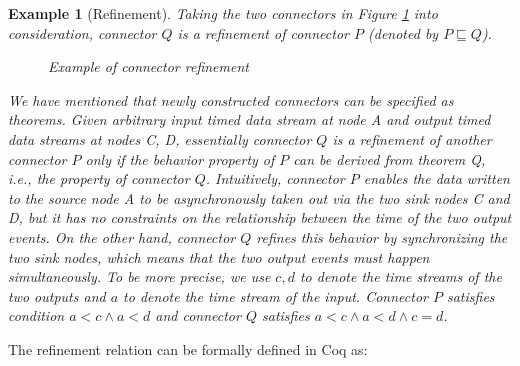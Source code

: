 \documentclass[preprint,3p]{elsarticle}
\newtheorem{example}{Example}[section]
\newtheorem{theorem}{Theorem}[section]
\begin{document}
\begin{example}[Refinement]
\label{ex:refine}
Taking the two connectors in Figure \ref{refine} into consideration, connector $Q$ is a refinement of connector $P$ (denoted by $P \sqsubseteq Q$).
\begin{figure}
\vspace{0cm}
\centering
{}
\caption{Example of connector refinement}
\label{refine}
\end{figure}

We have mentioned that newly constructed connectors can be specified as theorems. Given arbitrary input timed
data stream at node \emph{A} and output timed data streams at nodes \emph{C}, \emph{D}, essentially connector
$Q$ is a refinement of another connector $P$ only if the behavior property of $P$ can
be derived from \emph{theorem Q}, i.e., the property of connector $Q$. Intuitively, connector $P$ enables the
data written to the source node \emph{A} to be asynchronously taken out via the two sink nodes \emph{C} and \emph{D}, but
it has no constraints on the relationship between the time of the two output events. On the other hand,
connector $Q$ refines this behavior by synchronizing the two sink nodes, which means that the two output
events must happen simultaneously. To be more precise, we use $c,d$ to denote the time streams of the two outputs
and $a$ to denote the time stream of the input. Connector $P$ satisfies condition $a<c\wedge a<d$ and
connector $Q$ satisfies $a<c\wedge a<d \wedge c=d$.
\end{example}

The refinement relation can be formally defined in Coq as:

\end{document}
